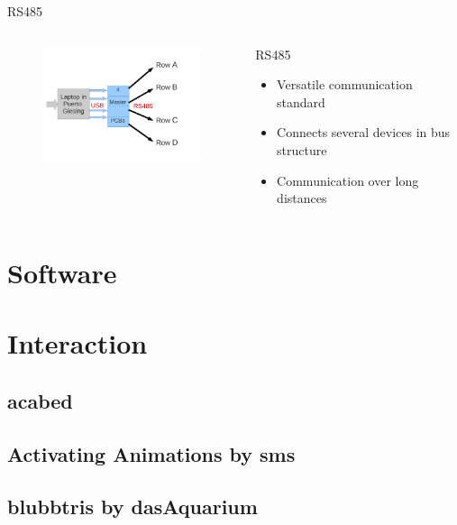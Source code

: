 \documentclass{beamer}
\begin{document}
  \begin{frame}{RS485}
    \begin{columns}
       \begin{column}{6cm}
        \begin{figure}
        \includegraphics[width=6cm, clip, trim= 1cm 3cm 4cm 2.5cm]{bilder/laptop.pdf}
        \end{figure}
      \end{column}
      \begin{column}{5cm}
      \begin{block}{RS485}
        \begin{itemize}
        \item Versatile communication standard
        \item Connects several devices in bus structure
        \item Communication over long distances
        \end{itemize}
      \end{block}
     \end{column}
   \end{columns}
  \end{frame}

\section{Software}
\section{Interaction}
    \subsection{acabed}
    \subsection{Activating Animations by sms}
    \subsection{blubbtris by dasAquarium}
\end{document}
